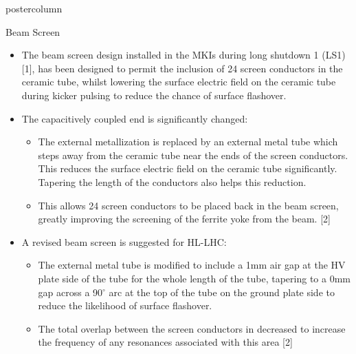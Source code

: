 \documentclass[final,hyperref={pdfpagelabels=false}]{beamer}
\begin{document}
\begin{frame}
\begin{columns}
\begin{column}{.49\textwidth}
\begin{beamercolorbox}[center,wd=\textwidth]{postercolumn}
\begin{minipage}[T]{.95\textwidth}
{\begin{block}{Beam Screen}
\begin{itemize}
\item{The beam screen design installed in the MKIs during long shutdown 1 (LS1) [1], has been designed to permit the inclusion of 24 screen conductors in the ceramic tube, whilst lowering the surface electric field on the ceramic tube during kicker pulsing to reduce the chance of surface flashover.}
\item{The capacitively coupled end is significantly changed:}
\begin{itemize}
\item{The external metallization is replaced by an external metal tube which steps away from the ceramic tube near the ends of the screen conductors. This reduces the surface electric field on the ceramic tube significantly. Tapering the length of the conductors also helps this reduction.}
\item{This allows 24 screen conductors to be placed back in the beam screen, greatly improving the screening of the ferrite yoke from the beam. [2]}
\end{itemize}
\item{A revised beam screen is suggested for HL-LHC:}
\begin{itemize}
\item{The external metal tube is modified to include a 1mm air gap at the HV plate side of the tube for the whole length of the tube, tapering to a 0mm gap across a 90$^{\circ}$ arc at the top of the tube on the ground plate side to reduce the likelihood of surface flashover.}
\item{The total overlap between the screen conductors in decreased to increase the frequency of any resonances associated with this area [2]}
\end{itemize}
\end{itemize}

	\end{block}

            \vfill


         \vfill
          }
        \end{minipage}
      \end{beamercolorbox}
    \end{column}


\end{columns}
\end{frame}
\end{document}
